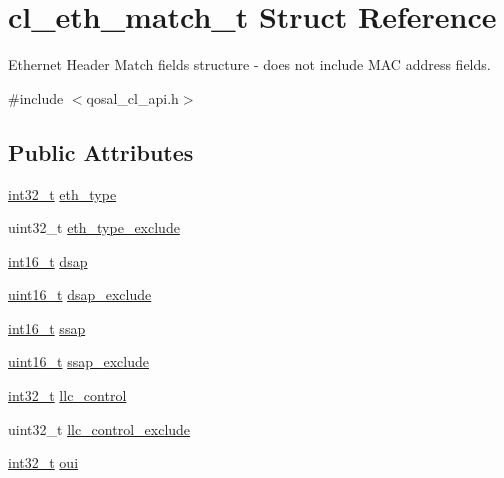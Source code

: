 \hypertarget{structcl__eth__match__t}{\section{cl\-\_\-eth\-\_\-match\-\_\-t Struct Reference}
\label{structcl__eth__match__t}
}


Ethernet Header Match fields structure -\/ does not include M\-A\-C address fields.  




{\ttfamily \#include $<$qosal\-\_\-cl\-\_\-api.\-h$>$}

\subsection*{Public Attributes}
\begin{DoxyCompactItemize}
\item 
\hyperlink{commondefs_8h_a32f2e37ee053cf2ce8ca28d1f74630e5}{int32\-\_\-t} \hyperlink{structcl__eth__match__t_ae43f837598b60d97a57d81de1cb4b229}{eth\-\_\-type}
\item 
uint32\-\_\-t \hyperlink{structcl__eth__match__t_a94740ba14b1c385c4cd0c09d80eaa0b5}{eth\-\_\-type\-\_\-exclude}
\item 
\hyperlink{commondefs_8h_a66634143db08bebe9b46ab4cb1fc6fd3}{int16\-\_\-t} \hyperlink{structcl__eth__match__t_a003c22e665dee4d5c3db4d94505b5b4c}{dsap}
\item 
\hyperlink{commondefs_8h_adf4d876453337156dde61095e1f20223}{uint16\-\_\-t} \hyperlink{structcl__eth__match__t_a52ecb236f565b9ec088e0e917bf425f3}{dsap\-\_\-exclude}
\item 
\hyperlink{commondefs_8h_a66634143db08bebe9b46ab4cb1fc6fd3}{int16\-\_\-t} \hyperlink{structcl__eth__match__t_af5927252a40f04d6aa2ef8104ec8ea88}{ssap}
\item 
\hyperlink{commondefs_8h_adf4d876453337156dde61095e1f20223}{uint16\-\_\-t} \hyperlink{structcl__eth__match__t_a410d143164a36bfb7ba1bf7ad0895e89}{ssap\-\_\-exclude}
\item 
\hyperlink{commondefs_8h_a32f2e37ee053cf2ce8ca28d1f74630e5}{int32\-\_\-t} \hyperlink{structcl__eth__match__t_aa4091325594c6a27181f4be25be09b88}{llc\-\_\-control}
\item 
uint32\-\_\-t \hyperlink{structcl__eth__match__t_afc8ec2cea0ef5c13a10b7dcdf4b50158}{llc\-\_\-control\-\_\-exclude}
\item 
\hyperlink{commondefs_8h_a32f2e37ee053cf2ce8ca28d1f74630e5}{int32\-\_\-t} \hyperlink{structcl__eth__match__t_a78e975708b3e168c80094896dc2fb022}{oui}

\end{DoxyCompactItemize}
